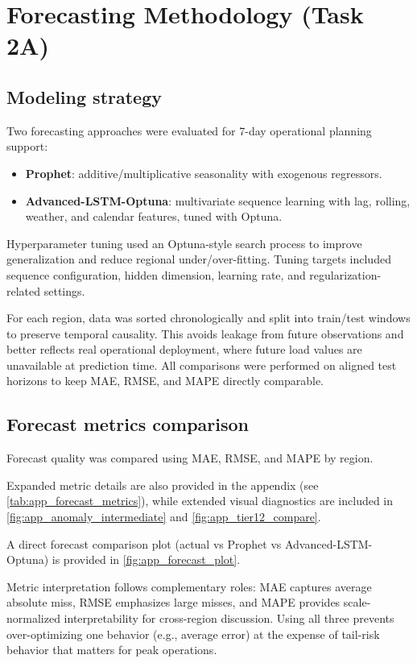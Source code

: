 \section{Forecasting Methodology (Task 2A)}

\subsection{Modeling strategy}
Two forecasting approaches were evaluated for 7-day operational planning support:
\begin{itemize}
	\item \textbf{Prophet}: additive/multiplicative seasonality with exogenous regressors.
	\item \textbf{Advanced-LSTM-Optuna}: multivariate sequence learning with lag, rolling, weather, and calendar features, tuned with Optuna.
\end{itemize}

Hyperparameter tuning used an Optuna-style search process to improve generalization and reduce regional under/over-fitting. Tuning targets included sequence configuration, hidden dimension, learning rate, and regularization-related settings.

For each region, data was sorted chronologically and split into train/test windows to preserve temporal causality. This avoids leakage from future observations and better reflects real operational deployment, where future load values are unavailable at prediction time. All comparisons were performed on aligned test horizons to keep MAE, RMSE, and MAPE directly comparable.

\subsection{Forecast metrics comparison}
Forecast quality was compared using MAE, RMSE, and MAPE by region.

Expanded metric details are also provided in the appendix (see \autoref{tab:app_forecast_metrics}), while extended visual diagnostics are included in \autoref{fig:app_anomaly_intermediate} and \autoref{fig:app_tier12_compare}.

A direct forecast comparison plot (actual vs Prophet vs Advanced-LSTM-Optuna) is provided in \autoref{fig:app_forecast_plot}.

Metric interpretation follows complementary roles: MAE captures average absolute miss, RMSE emphasizes large misses, and MAPE provides scale-normalized interpretability for cross-region discussion. Using all three prevents over-optimizing one behavior (e.g., average error) at the expense of tail-risk behavior that matters for peak operations.

